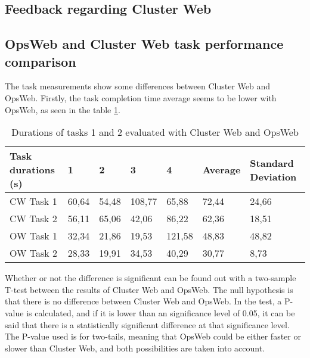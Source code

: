 \subsection{Feedback regarding Cluster Web}

\subsection{OpsWeb and Cluster Web task performance comparison}
The task measurements show some differences between Cluster Web and OpsWeb. Firstly, the task completion time average seems to be lower with OpsWeb, as seen in the table \ref{cw_ow_times}.

\begin{table}[!ht]
\def\arraystretch{1.1}%
    \begin{center}
    \caption{Durations of tasks 1 and 2 evaluated with Cluster Web and OpsWeb}
    \label{cw_ow_times}
    \begin{tabular}{| l | l | l | l | l | l | l | }
    \hline
    Task durations (s) & 1     & 2     & 3      & 4      & Average & Standard Deviation \\
    \hline
    CW Task 1            & 60,64 & 54,48 & 108,77 & 65,88  & 72,44   & 24,66              \\
    CW Task 2            & 56,11 & 65,06 & 42,06  & 86,22  & 62,36   & 18,51              \\
    OW Task 1            & 32,34 & 21,86 & 19,53  & 121,58 & 48,83   & 48,82              \\
    OW Task 2            & 28,33 & 19,91 & 34,53  & 40,29  & 30,77   & 8,73              \\
    \hline
    \end{tabular}
    \end{center}
\end{table}

Whether or not the difference is significant can be found out with a two-sample T-test between the results of Cluster Web and OpsWeb. The null hypothesis is that there is no difference between Cluster Web and OpsWeb. In the test, a P-value is calculated, and if it is lower than an significance level of 0.05, it can be said that there is a statistically significant difference at that significance level. The P-value used is for two-tails, meaning that OpsWeb could be either faster or slower than Cluster Web, and both possibilities are taken into account.

